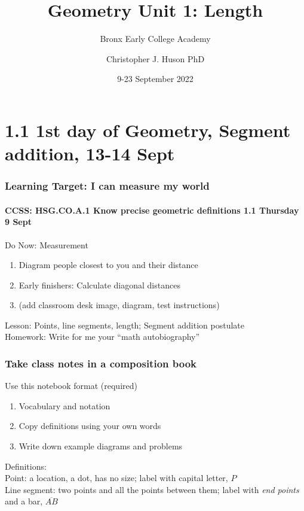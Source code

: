 \documentclass{beamer}
\title{Geometry Unit 1: Length}
\subtitle[BECA]{Bronx Early College Academy}
\author[Huson]{Christopher J. Huson PhD}
\date{9-23 September 2022}
\begin{document}
\frame{\titlepage}

\section[Outline]{}
\frame{\tableofcontents}

\section{1.1 1st day of Geometry, Segment addition, 13-14 Sept}
\frame
{
  \frametitle{Learning Target: I can measure my world}
  \framesubtitle{CCSS: HSG.CO.A.1 Know precise geometric definitions \hfill \alert{1.1 Thursday 9 Sept}}

  \begin{block}{Do Now: Measurement}
  \begin{enumerate}
      \item Diagram people closest to you and their distance
      \item Early finishers: Calculate diagonal distances
      \item (add classroom desk image, diagram, test instructions)
  \end{enumerate}
  \end{block}
  Lesson: Points, line segments, length; Segment addition postulate \\[0.25cm]
  Homework: Write for me your ``math autobiography''
}

\frame
{
  \frametitle{Take class notes in a composition book}
  \begin{block}{Use this notebook format (required)}
    \begin{enumerate}
      \item Vocabulary and notation
      \item Copy definitions using your own words
      \item Write down example diagrams and problems
    \end{enumerate}
    \end{block}
    Definitions: \\
  Point: a location, a dot, has no size; label with capital letter, $P$ \\[0.25cm]
  Line segment: two points and all the points between them; label with \emph{end points} and a bar, $\overline{AB}$ \\
}
\end{document}
